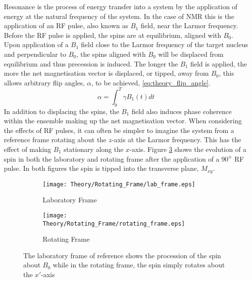 Resonance is the process of energy transfer into a system by the application of energy at the natural frequency of the system. In the case of \ac{NMR} this is the application of an \ac{RF} pulse, also known as $B_1$ field, near the Larmor frequency. Before the \ac{RF} pulse is applied, the spins are at equilibrium, aligned with $B_0$. Upon application of a $B_1$ field close to the Larmor frequency of the target nucleus and perpendicular to $B_0$, the spins aligned with $B_0$ will be displaced from equilibrium and thus precession is induced. The longer the $B_1$ field is applied, the more the net magnetisation vector is displaced, or tipped, away from $B_0$, this allows arbitrary flip angles, $\alpha$, to be achieved, \eqref{eq:theory_flip_angle}. 
\begin{equation}
\alpha = \int_{0}^{T} \gamma B_1\left(t\right) dt
\label{eq:theory_flip_angle}
\end{equation}
In addition to displacing the spins, the $B_1$ field also induces phase coherence within the ensemble making up the net magnetisation vector. When considering the effects of \ac{RF} pulses, it can often be simpler to imagine the system from a reference frame rotating about the $z$-axis at the Larmor frequency. This has the effect of making $B_1$ stationary along the $x$-axis. Figure \ref{fig:theory_reference_frames} shows the evolution of a spin in both the laboratory and rotating frame after the application of a 90$\degree$  \ac{RF} pulse. In both figures the spin is tipped into the transverse plane, $M_{xy}$.

\begin{figure}[H]
	\centering
	\begin{subfigure}[c]{0.47\textwidth}
		\centering
		\texttt{[image: Theory/Rotating\_Frame/lab\_frame.eps]}
		\caption{Laboratory Frame}
		\label{fig:thoery_lab_frame}
	\end{subfigure}
	\hfill
	\begin{subfigure}[c]{0.47\textwidth}
		\centering
		\texttt{[image: Theory/Rotating\_Frame/rotating\_frame.eps]}
		\caption{Rotating Frame}
		\label{fig:theory_rotating_frame}
	\end{subfigure}
	\caption{The laboratory frame of reference shows the procession of the spin about $B_0$ while in the rotating frame, the spin simply rotates about the $x'$-axis}
	\label{fig:theory_reference_frames}
\end{figure}

